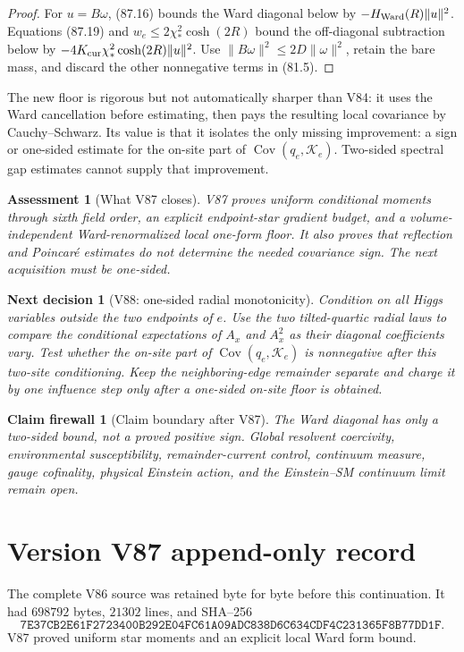 \documentclass[11pt]{article}
\newtheorem{firewall}[theorem]{Claim firewall}
\newtheorem{decision}[theorem]{Next decision}
\newtheorem{assessment}[theorem]{Assessment}
\theoremstyle{remark}
\begin{document}
\begin{proof}
For \(u=B\omega\), (87.16) bounds the Ward diagonal below by
\(-H_{\rm Ward}(R)\|u\|^2\).  Equations (87.19) and
\(w_e\leq2\chi_*^2\cosh(2R)\) bound the off-diagonal subtraction below
by
\(-4K_{\rm cur}\chi_*^2\cosh(2R)\|u\|^2\).
Use \(\|B\omega\|^2\leq2D\|\omega\|^2\), retain the bare mass, and
discard the other nonnegative terms in (81.5).
\end{proof}

The new floor is rigorous but not automatically sharper than V84: it
uses the Ward cancellation before estimating, then pays the resulting
local covariance by Cauchy--Schwarz.  Its value is that it isolates the
only missing improvement: a sign or one-sided estimate for the on-site
part of \(\operatorname{Cov}(q_e,\mathcal K_e)\).  Two-sided spectral
gap estimates cannot supply that improvement.

\begin{assessment}[What V87 closes]
\label{ass:v17v87-status}
V87 proves uniform conditional moments through sixth field order,
an explicit endpoint-star gradient budget, and a volume-independent
Ward-renormalized local one-form floor.  It also proves that reflection
and Poincar\'e estimates do not determine the needed covariance sign.
The next acquisition must be one-sided.
\end{assessment}

\begin{decision}[V88: one-sided radial monotonicity]
\label{dec:v17v87-next}
Condition on all Higgs variables outside the two endpoints of \(e\).
Use the two tilted-quartic radial laws to compare the conditional
expectations of \(A_x\) and \(A_x^2\) as their diagonal coefficients
vary.  Test whether the on-site part of
\(\operatorname{Cov}(q_e,\mathcal K_e)\) is nonnegative after this
two-site conditioning.  Keep the neighboring-edge remainder separate
and charge it by one influence step only after a one-sided on-site
floor is obtained.
\end{decision}

\begin{firewall}[Claim boundary after V87]
\label{fire:v17v87}
The Ward diagonal has only a two-sided bound, not a proved positive
sign.  Global resolvent coercivity, environmental susceptibility,
remainder-current control, continuum measure, gauge cofinality,
physical Einstein action, and the Einstein--SM continuum limit remain
open.
\end{firewall}

\section*{Version V87 append-only record}
The complete V86 source was retained byte for byte before this
continuation.  It had \(698792\) bytes, \(21302\) lines, and SHA--256
\[
 \texttt{7E37CB2E61F2723400B292E04FC61A09ADC838D6C634CDF4C231365F8B77DD1F}.
\]
V87 proved uniform star moments and an explicit local Ward form bound.
\end{document}
